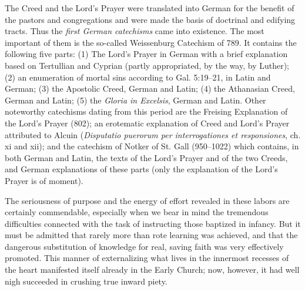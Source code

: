 The Creed and the Lord’s Prayer were translated into German for the benefit of the pastors and congregations and were made the basis of doctrinal and edifying tracts. Thus the \emph{first German catechisms} came into existence. The most important of them is the so-called Weissenburg Catechism of 789. It contains the following five parts: (1) The Lord’s Prayer in German with a brief explanation based on Tertullian and Cyprian (partly appropriated, by the way, by Luther); (2) an enumeration of mortal sins according to Gal. 5:19–21, in Latin and German; (3) the Apostolic Creed, German and Latin; (4) the Athanasian Creed, German and Latin; (5) the \emph{Gloria in Excelsis}, German and Latin. Other noteworthy catechisms dating from this period are the Freising Explanation of the Lord’s Prayer (802); an erotematic explanation of Creed and Lord’s Prayer attributed to Alcuin (\emph{Disputatio puerorum per interrogationes et responsiones}, ch. xi and xii); and the catechism of Notker of St. Gall (950–1022) which contains, in both German and Latin, the texts of the Lord’s Prayer and of the two Creeds, and German explanations of these parts (only the explanation of the Lord’s Prayer is of moment).

The seriousness of purpose and the energy of effort revealed in these labors are certainly commendable, especially when we bear in mind the tremendous difficulties connected with the task of instructing those baptized in infancy. But it must be admitted that rarely more than rote learning was
achieved, and that the dangerous substitution of knowledge for real, saving faith was very effectively promoted. This manner of externalizing what lives in the innermost recesses of the heart manifested itself already in the Early Church; now, however, it had well nigh succeeded in crushing true inward piety.

